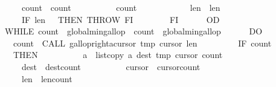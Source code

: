 \begin{isabellebody}
\ \ \ \ \ \ \ \ \ \ {\isasymacute}count{}\ {\isacharcolon}{\isacharequal}{\isacharequal}\ {\isasymacute}count{}{\isacharplus}{}{\isacharsemicolon}{\isacharsemicolon}\isanewline
\ \ \ \ \ \ \ \ \ \ {\isasymacute}count{}\ {\isacharcolon}{\isacharequal}{\isacharequal}\ {}{\isacharsemicolon}{\isacharsemicolon}\isanewline
\ \ \ \ \ \ \ \ \ \ {\isasymacute}len{}\ {\isacharcolon}{\isacharequal}{\isacharequal}\ {\isasymacute}len{}{\isacharminus}{}{\isacharsemicolon}{\isacharsemicolon}\isanewline
\ \ \ \ \ \ \ \ \ \ IF\ {\isasymacute}len{}\ {\isacharequal}\ {}\ THEN\ THROW\ FI\isanewline
\ \ \ \ \ \ \ \ FI\isanewline
\ \ \ \ \ \ OD{\isacharsemicolon}{\isacharsemicolon}\isanewline
\ \ \ \ \ \ WHILE\ {\isacharparenleft}{\isasymacute}count{}\ {\isasymge}\ {\isasymacute}global{\isacharunderscore}min{\isacharunderscore}gallop\ {\isacharbar}\ {\isasymacute}count{}\ {\isasymge}\ {\isasymacute}global{\isacharunderscore}min{\isacharunderscore}gallop{\isacharparenright}\isanewline
\ \ \ \ \ \ DO\isanewline
\ \ \ \ \ \ \ \ {\isasymacute}count{}\ {\isacharcolon}{\isacharequal}{\isacharequal}\ CALL\ gallop{\isacharunderscore}right{\isacharparenleft}{\isasymacute}a{\isacharbang}{\isasymacute}cursor{}{\isacharcomma}\ {\isasymacute}tmp{\isacharcomma}\ {\isasymacute}cursor{}{\isacharcomma}\ {\isasymacute}len{}{\isacharcomma}\ {}{\isacharparenright}{\isacharsemicolon}{\isacharsemicolon}\isanewline
\ \ \ \ \ \ \ \ IF\ {\isasymacute}count{}\ {\isasymnoteq}\ {}\isanewline
\ \ \ \ \ \ \ \ THEN\isanewline
\ \ \ \ \ \ \ \ \ \ {\isasymacute}a\ {\isacharcolon}{\isacharequal}{\isacharequal}\ list{\isacharunderscore}copy\ {\isasymacute}a\ {\isasymacute}dest\ {\isasymacute}tmp\ {\isasymacute}cursor{}\ {\isasymacute}count{}{\isacharsemicolon}{\isacharsemicolon}\isanewline
\ \ \ \ \ \ \ \ \ \ {\isasymacute}dest\ {\isacharcolon}{\isacharequal}{\isacharequal}\ {\isasymacute}dest{\isacharplus}{\isasymacute}count{}{\isacharsemicolon}{\isacharsemicolon}\isanewline
\ \ \ \ \ \ \ \ \ \ {\isasymacute}cursor{}\ {\isacharcolon}{\isacharequal}{\isacharequal}\ {\isasymacute}cursor{}{\isacharplus}{\isasymacute}count{}{\isacharsemicolon}{\isacharsemicolon}\isanewline
\ \ \ \ \ \ \ \ \ \ {\isasymacute}len{}\ {\isacharcolon}{\isacharequal}{\isacharequal}\ {\isasymacute}len{}{\isacharminus}{\isasymacute}count{}{\isacharsemicolon}{\isacharsemicolon}\isanewline

\end{isabellebody}
